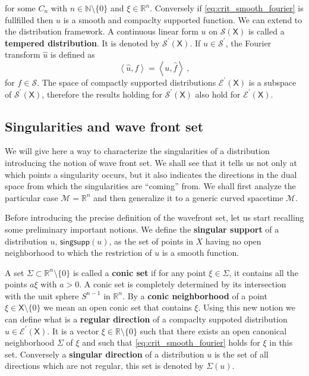 \documentclass[11pt]{book}
\newcommand{\singsupp}{\mathsf{singsupp}}
\newcommand{\sm}[1]{\left\langle#1\right\rangle}
\newcommand{\Ecal}{\mathcal{E}}
\newcommand{\Mcal}{\mathcal{M}}
\newcommand{\Scal}{\mathcal{S}}
\newcommand{\Nbb}{\mathbb{N}}
\newcommand{\Rbb}{\mathbb{R}}
\newcommand{\Xsf}{\mathsf{X}}
\theoremstyle{break}
\begin{document}
%
for some $C_n$ with $n \in \Nbb \setminus \{0\}$ and $\xi \in \Rbb^n$. Conversely if \eqref{eq:crit_smooth_fourier} is fullfilled then $u$ is a smooth and compaclty supported function. We can extend to the distribution framework. A continuous linear form $u$ on $\Scal(\Xsf)$ is called a \textbf{tempered distribution}. It is denoted by $\Scal^\prime(\Xsf)$. 
%
If $u \in \Scal^\prime$, the Fourier transform $\hat{u}$ is defined as 
%
\begin{equation*}
\sm{\hat{u},f} = \sm{u,\hat{f}} \ ,
\end{equation*}
%
for $f \in \Scal$. The space of compactly supported distributions $\Ecal^\prime(\Xsf)$ is a subspace of $\Scal^\prime(\Xsf)$, therefore the results holding for $\Scal^\prime(\Xsf)$ also hold for $\Ecal^\prime(\Xsf)$. 


\subsection{Singularities and wave front set}\label{p:SING_WF}


We will give here a way to characterize the singularities of a distribution introducing the notion of wave front set. We shall see that it tells us not only at which points a singularity occurs, but it also indicates the directions in the dual space from which the singularities are ``coming'' from. We shall first analyze the particular case $\Mcal = \Rbb^n$ and then generalize it to a generic curved spacetime $\Mcal$. 


Before introducing the precise definition of the wavefront set, let us start recalling some preliminary important notions. We define the \textbf{singular support} of a distribution $u$, $\singsupp(u)$, as the set of points in $X$ having no open neighborhood to which the restriction of $u$ is a smooth function. 


A set $\Sigma \subset \Rbb^n \setminus \{0\}$ is called a \textbf{conic set} if for any point $\xi \in \Sigma$, it contains all the points $a \xi$ with $a > 0$. A conic set is completely determined by its intersection with the unit sphere $S^{n-1}$ in $\Rbb^n$. By a \textbf{conic neighborhood} of a point $\xi \in \Xsf \setminus \{0\}$ we mean an open conic set that contains $\xi$. Using this new notion we can define what is a \textbf{regular direction} of a compaclty suppoted distribution $u\in\Ecal^\prime(\Xsf)$. It is a vector $\xi \in \Rbb\setminus\{0\}$ such that there exists an open canonical neighborhood $\Sigma$ of $\xi$ and such that \eqref{eq:crit_smooth_fourier} holds for $\xi$ in this set. Conversely a \textbf{singular direction} of a distribution $u$ is the set of all directions which are not regular, this set is denoted by $\Sigma (u)$.
\end{document}
